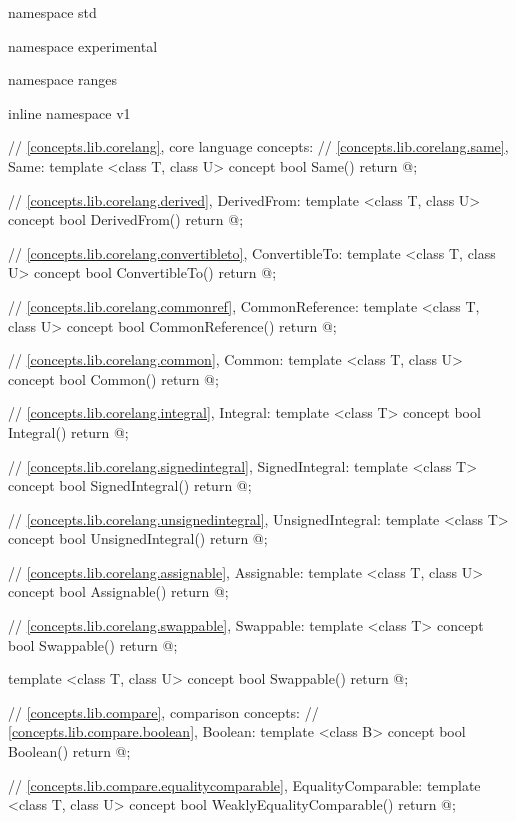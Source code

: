 %
\begin{codeblock}
namespace std { namespace experimental { namespace ranges { inline namespace v1 {
  // \ref{concepts.lib.corelang}, core language concepts:
  // \ref{concepts.lib.corelang.same}, Same:
  template <class T, class U>
  concept bool Same() {
    return @\seebelow@;
  }

  // \ref{concepts.lib.corelang.derived}, DerivedFrom:
  template <class T, class U>
  concept bool DerivedFrom() {
    return @\seebelow@;
  }

  // \ref{concepts.lib.corelang.convertibleto}, ConvertibleTo:
  template <class T, class U>
  concept bool ConvertibleTo() {
    return @\seebelow@;
  }

  // \ref{concepts.lib.corelang.commonref}, CommonReference:
  template <class T, class U>
  concept bool CommonReference() {
    return @\seebelow@;
  }

  // \ref{concepts.lib.corelang.common}, Common:
  template <class T, class U>
  concept bool Common() {
    return @\seebelow@;
  }

  // \ref{concepts.lib.corelang.integral}, Integral:
  template <class T>
  concept bool Integral() {
    return @\seebelow@;
  }

  // \ref{concepts.lib.corelang.signedintegral}, SignedIntegral:
  template <class T>
  concept bool SignedIntegral() {
    return @\seebelow@;
  }

  // \ref{concepts.lib.corelang.unsignedintegral}, UnsignedIntegral:
  template <class T>
  concept bool UnsignedIntegral() {
    return @\seebelow@;
  }

  // \ref{concepts.lib.corelang.assignable}, Assignable:
  template <class T, class U>
  concept bool Assignable() {
    return @\seebelow@;
  }

  // \ref{concepts.lib.corelang.swappable}, Swappable:
  template <class T>
  concept bool Swappable() {
    return @\seebelow@;
  }

  template <class T, class U>
  concept bool Swappable() {
    return @\seebelow@;
  }

  // \ref{concepts.lib.compare}, comparison concepts:
  // \ref{concepts.lib.compare.boolean}, Boolean:
  template <class B>
  concept bool Boolean() {
    return @\seebelow@;
  }

  // \ref{concepts.lib.compare.equalitycomparable}, EqualityComparable:
  template <class T, class U>
  concept bool WeaklyEqualityComparable() {
    return @\seebelow@;
  }

}}}}
\end{codeblock}
